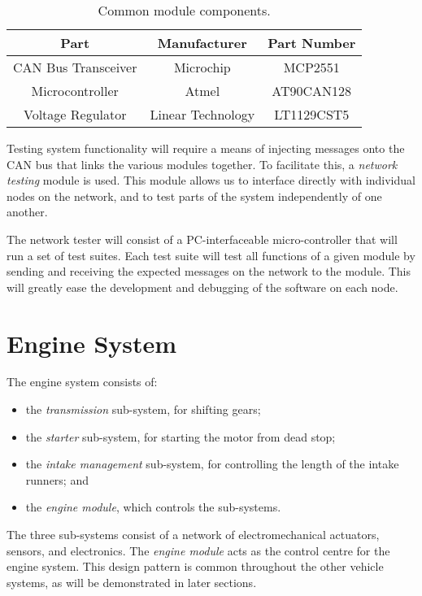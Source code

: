 \begin{table}[H]
	\caption{Common module components.}
	\label{table:common_module_components}
	\centering
	\begin{tabular}{|c|c|c|}
		\hline 
		Part & Manufacturer & Part Number\tabularnewline 
		\hline \hline
		CAN Bus Transceiver & Microchip & MCP2551\tabularnewline \hline
		Microcontroller & Atmel & AT90CAN128\tabularnewline \hline
		Voltage Regulator & Linear Technology & LT1129CST5\tabularnewline		
		\hline
	\end{tabular}
\end{table}

Testing system functionality will require a means of injecting messages onto the CAN bus that links the various modules together. To facilitate this, a \emph{network testing} module is used. This module allows us to interface directly with individual nodes on the network, and to test parts of the system independently of one another. 

The network tester will consist of a PC-interfaceable micro-controller that will run a set of test suites. Each test suite will test all functions of a given module by sending and receiving the expected messages on the network to the module. This will greatly ease the development and debugging of the software on each node.

%
%

\section{Engine System}
\label{sec:engine_system}

The engine system consists of:

\begin{itemize}
\item the \emph{transmission} sub-system, for shifting gears;
\item the \emph{starter} sub-system, for starting the motor from dead stop; 
\item the \emph{intake management} sub-system, for controlling the length of the intake runners; and
\item the \emph{engine module}, which controls the sub-systems.
\end{itemize}

The three sub-systems consist of a network of electromechanical actuators, sensors, and electronics. The \emph{engine module} acts as the control centre for the engine system. This design pattern is common throughout the other vehicle systems, as will be demonstrated in later sections.

